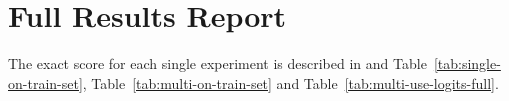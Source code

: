 \documentclass[11pt,a4paper]{article}
\begin{document}
\section{Full Results Report}
\label{apx:full-results-report}
The exact score for each single experiment is described in and Table~\ref{tab:single-on-train-set}, Table~\ref{tab:multi-on-train-set} and Table~\ref{tab:multi-use-logits-full}.




\end{document}
